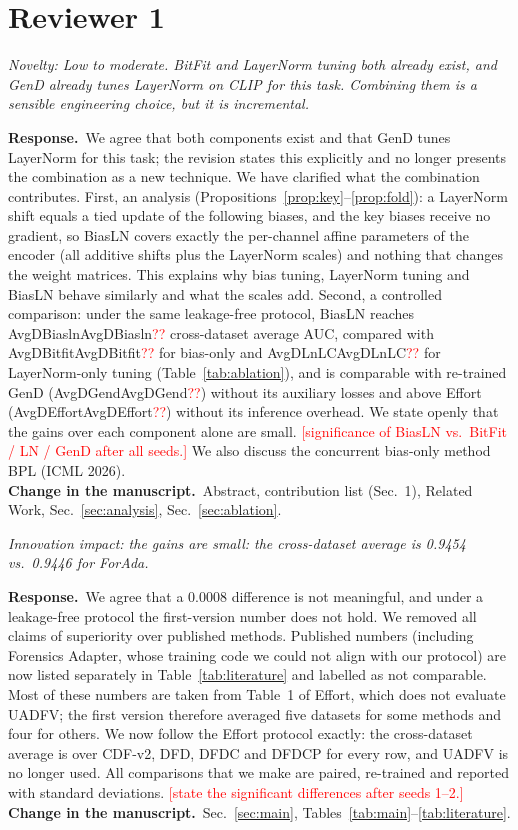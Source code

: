 \documentclass[11pt]{article}
\newif\ifpending\pendingtrue
\newcommand{\pending}[1]{\ifpending\textcolor{red}{[#1]}\else\errmessage{pending: #1}\fi}
\newcommand{\num}[1]{\ifcsname #1\endcsname\csname #1\endcsname\else\textcolor{red}{??}\fi}
\newenvironment{comment}{\par\medskip\noindent\begin{minipage}{\linewidth}\color{black!70}\itshape}{\end{minipage}\par\smallskip}
\newcommand{\resp}{\noindent\textbf{Response.}~}
\newcommand{\change}{\noindent\textbf{Change in the manuscript.}~}
\begin{document}
\section*{Reviewer 1}

\begin{comment}
Novelty: Low to moderate. BitFit and LayerNorm tuning both already exist, and GenD already tunes LayerNorm on CLIP for this task. Combining them is a sensible engineering choice, but it is incremental.
\end{comment}
\resp We agree that both components exist and that GenD tunes LayerNorm for this task; the revision states this explicitly and no longer presents the combination as a new technique. We have clarified what the combination contributes. First, an analysis (Propositions~\ref{prop:key}--\ref{prop:fold}): a LayerNorm shift equals a tied update of the following biases, and the key biases receive no gradient, so BiasLN covers exactly the per-channel affine parameters of the encoder (all additive shifts plus the LayerNorm scales) and nothing that changes the weight matrices. This explains why bias tuning, LayerNorm tuning and BiasLN behave similarly and what the scales add. Second, a controlled comparison: under the same leakage-free protocol, BiasLN reaches \num{AvgDBiasln} cross-dataset average AUC, compared with \num{AvgDBitfit} for bias-only and \num{AvgDLnLC} for LayerNorm-only tuning (Table~\ref{tab:ablation}), and is comparable with re-trained GenD (\num{AvgDGend}) without its auxiliary losses and above Effort (\num{AvgDEffort}) without its inference overhead. We state openly that the gains over each component alone are small. \pending{significance of BiasLN vs.\ BitFit / LN / GenD after all seeds.} We also discuss the concurrent bias-only method BPL (ICML 2026).\\
\change Abstract, contribution list (Sec.~1), Related Work, Sec.~\ref{sec:analysis}, Sec.~\ref{sec:ablation}.

\begin{comment}
Innovation impact: the gains are small: the cross-dataset average is 0.9454 vs.\ 0.9446 for ForAda.
\end{comment}
\resp We agree that a 0.0008 difference is not meaningful, and under a leakage-free protocol the first-version number does not hold. We removed all claims of superiority over published methods. Published numbers (including Forensics Adapter, whose training code we could not align with our protocol) are now listed separately in Table~\ref{tab:literature} and labelled as not comparable. Most of these numbers are taken from Table~1 of Effort, which does not evaluate UADFV; the first version therefore averaged five datasets for some methods and four for others. We now follow the Effort protocol exactly: the cross-dataset average is over CDF-v2, DFD, DFDC and DFDCP for every row, and UADFV is no longer used. All comparisons that we make are paired, re-trained and reported with standard deviations. \pending{state the significant differences after seeds 1--2.}\\
\change Sec.~\ref{sec:main}, Tables~\ref{tab:main}--\ref{tab:literature}.
\end{document}
